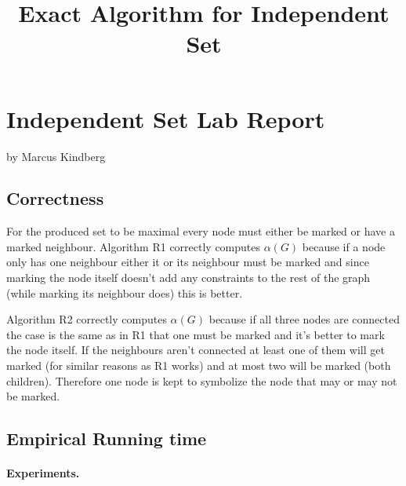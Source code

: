 \documentclass{tufte-handout}
\title{\sf Exact Algorithm for Independent Set}
\author{}
\begin{document}
\section{Independent Set Lab Report}


by Marcus Kindberg

\subsection{Correctness}
For the produced set to be maximal every node must either be marked or have a marked neighbour.
Algorithm R1 correctly computes $\alpha(G)$ because if a node only has one neighbour either it or its neighbour must be marked and since marking the node itself doesn't add any constraints to the rest of the graph (while marking its neighbour does) this is better.

\noindent
Algorithm R2 correctly computes $\alpha(G)$ because if all three nodes are connected the case is the same as in R1 that one must be marked and it's better to mark the node itself. If the neighbours aren't connected at least one of them will get marked (for similar reasons as R1 works) and at most two will be marked (both children). Therefore one node is kept to symbolize the node that may or may not be marked.

\subsection{Empirical Running time}

\paragraph{Experiments.}

\medskip

\noindent
{}
\end{document}
